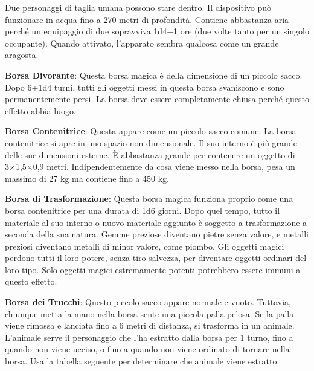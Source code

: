 \documentclass{article}
\begin{document}
\begin{multicols}{2}
\begin{table}[h]
\end{table}

Due personaggi di taglia umana possono stare dentro. Il dispositivo può funzionare in acqua fino a 270 metri di profondità. Contiene abbastanza aria perché un equipaggio di due sopravviva 1d4+1 ore (due volte tanto per un singolo occupante). Quando attivato, l'apparato sembra qualcosa come un grande aragosta.

\textbf{Borsa Divorante}: Questa borsa magica è della dimensione di un piccolo sacco. Dopo 6+1d4 turni, tutti gli oggetti messi in questa borsa svaniscono e sono permanentemente persi. La borsa deve essere completamente chiusa perché questo effetto abbia luogo.

\textbf{Borsa Contenitrice}: Questa appare come un piccolo sacco comune. La borsa contenitrice si apre in uno spazio non dimensionale. Il suo interno è più grande delle sue dimensioni esterne. È abbastanza grande per contenere un oggetto di 3×1,5×0,9 metri. Indipendentemente da cosa viene messo nella borsa, pesa un massimo di 27 kg ma contiene fino a 450 kg.

\textbf{Borsa di Trasformazione}: Questa borsa magica funziona proprio come una borsa contenitrice per una durata di 1d6 giorni. Dopo quel tempo, tutto il materiale al suo interno o nuovo materiale aggiunto è soggetto a trasformazione a seconda della sua natura. Gemme preziose diventano pietre senza valore, e metalli preziosi diventano metalli di minor valore, come piombo. Gli oggetti magici perdono tutti il loro potere, senza tiro salvezza, per diventare oggetti ordinari del loro tipo. Solo oggetti magici estremamente potenti potrebbero essere immuni a questo effetto.

\textbf{Borsa dei Trucchi}: Questo piccolo sacco appare normale e vuoto. Tuttavia, chiunque metta la mano nella borsa sente una piccola palla pelosa. Se la palla viene rimossa e lanciata fino a 6 metri di distanza, si trasforma in un animale. L'animale serve il personaggio che l'ha estratto dalla borsa per 1 turno, fino a quando non viene ucciso, o fino a quando non viene ordinato di tornare nella borsa. Usa la tabella seguente per determinare che animale viene estratto.


\end{multicols}
\end{document}
